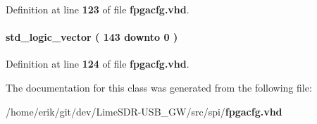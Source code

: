Definition at line {\bf 123} of file {\bf fpgacfg.\+vhd}.

\paragraph[{spi\+\_\+config\+\_\+data\+\_\+rev}]{ {\bfseries \textcolor{comment}{std\+\_\+logic\+\_\+vector}\textcolor{vhdlchar}{ }\textcolor{vhdlchar}{(}\textcolor{vhdlchar}{ }\textcolor{vhdlchar}{ } \textcolor{vhdldigit}{143} \textcolor{vhdlchar}{ }\textcolor{keywordflow}{downto}\textcolor{vhdlchar}{ }\textcolor{vhdlchar}{ } \textcolor{vhdldigit}{0} \textcolor{vhdlchar}{ }\textcolor{vhdlchar}{)}\textcolor{vhdlchar}{ }} \hspace{0.3cm}{\ttfamily [Signal]}}\label{classfpgacfg_1_1fpgacfg__arch_aff1f2243afa099f0988a7ec41520f197}


Definition at line {\bf 124} of file {\bf fpgacfg.\+vhd}.



The documentation for this class was generated from the following file\+:\begin{DoxyCompactItemize}
\item 
/home/erik/git/dev/\+Lime\+S\+D\+R-\/\+U\+S\+B\+\_\+\+G\+W/src/spi/{\bf fpgacfg.\+vhd}\end{DoxyCompactItemize}
